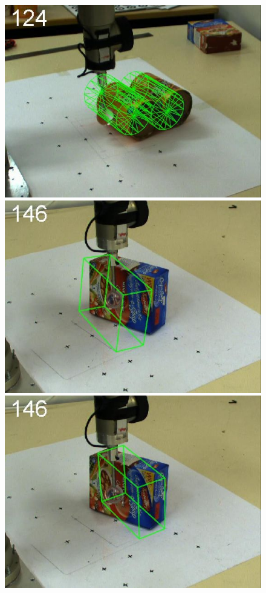 \begin{figure}[t]
{\includegraphics[width=\imgCXwid]{./C2_3exp_75_3}
\includegraphics[width=\imgCXwid]{./C1_1exp_87_3}
\includegraphics[width=\imgCXwid]{./C1_2exp_87_3}
}
\end{figure}

